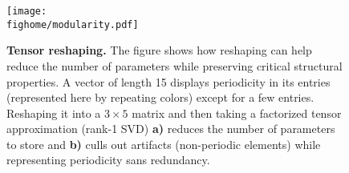 \begin{figure}[!htbp]
    \vspace{-0.5em}
    \centering
    \texttt{[image: \\fighome/modularity.pdf]}
    \vspace{-0.5em}
    \caption{\textbf{Tensor reshaping.} 
    The figure shows how reshaping can help reduce the number of parameters while preserving critical structural properties. A vector of length 15 displays periodicity in its entries (represented here by repeating colors) except for a few entries. Reshaping it into a $3\times 5$ matrix and then taking a factorized tensor approximation (rank-1 SVD) \textbf{a)} reduces the number of parameters to store and \textbf{b)} culls out artifacts (non-periodic elements) while representing periodicity sans redundancy.
    }
\label{fig:periodicity}
\vspace{-1em}
\end{figure}
